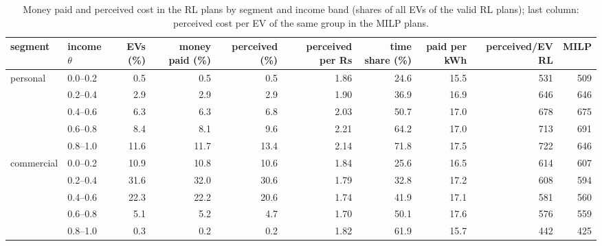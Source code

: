 \begin{table}[H]\centering
\footnotesize
\caption{Money paid and perceived cost in the RL plans by segment and income band (shares of all EVs of the valid RL plans); last column: perceived cost per EV of the same group in the MILP plans.}\label{tab:equity}
\begin{adjustbox}{max width=\textwidth}\begin{tabular}{llrrrrrrrr}\toprule
segment & income $\theta$ & EVs (\%) & money paid (\%) & perceived (\%) & perceived per Rs & time share (\%) & paid per kWh & perceived/EV RL & MILP \\ \midrule
personal & 0.0--0.2 & 0.5 & 0.5 & 0.5 & 1.86 & 24.6 & 15.5 & 531 & 509 \\
 & 0.2--0.4 & 2.9 & 2.9 & 2.9 & 1.90 & 36.9 & 16.9 & 646 & 646 \\
 & 0.4--0.6 & 6.3 & 6.3 & 6.8 & 2.03 & 50.7 & 17.0 & 678 & 675 \\
 & 0.6--0.8 & 8.4 & 8.1 & 9.6 & 2.21 & 64.2 & 17.0 & 713 & 691 \\
 & 0.8--1.0 & 11.6 & 11.7 & 13.4 & 2.14 & 71.8 & 17.5 & 722 & 646 \\
commercial & 0.0--0.2 & 10.9 & 10.8 & 10.6 & 1.84 & 25.6 & 16.5 & 614 & 607 \\
 & 0.2--0.4 & 31.6 & 32.0 & 30.6 & 1.79 & 32.8 & 17.2 & 608 & 594 \\
 & 0.4--0.6 & 22.3 & 22.2 & 20.6 & 1.74 & 41.9 & 17.1 & 581 & 560 \\
 & 0.6--0.8 & 5.1 & 5.2 & 4.7 & 1.70 & 50.1 & 17.6 & 576 & 559 \\
 & 0.8--1.0 & 0.3 & 0.2 & 0.2 & 1.82 & 61.9 & 15.7 & 442 & 425 \\
\bottomrule\end{tabular}\end{adjustbox}\end{table}
